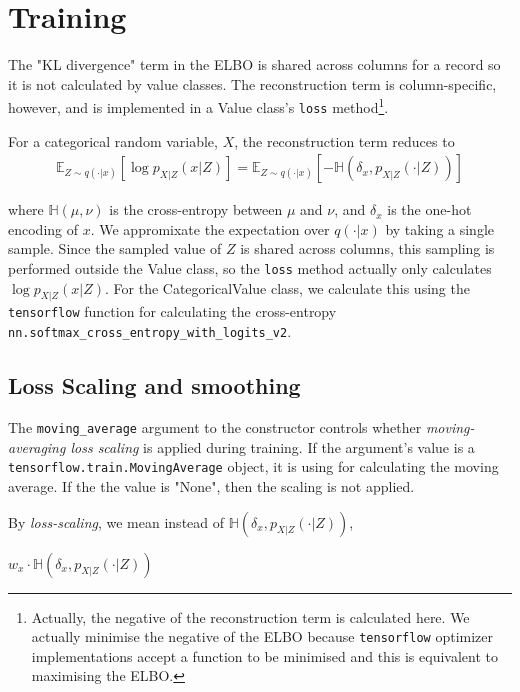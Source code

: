\documentclass[11pt]{article}
\begin{document}
\section{Training}
\label{sec:org884ffeb}
The "KL divergence" term in the ELBO is shared across columns for a record so it is not calculated by value classes. The reconstruction term is column-specific, however, and is implemented in a \textsf{Value} class's \texttt{loss} method\footnote{Actually, the negative of the reconstruction term is calculated here. We actually minimise the negative of the ELBO because \texttt{tensorflow} optimizer implementations accept a function to be minimised and this is equivalent to maximising the ELBO.}.

For a categorical random variable, \(X\), the reconstruction term reduces to 
\begin{equation}
\begin{split}
\mathbb{E}_{Z\sim q(\cdot|x)}[\log p_{X|Z}(x|Z)] = \mathbb{E}_{Z\sim q(\cdot|x)}[-\mathbb{H}(\delta_x, p_{X|Z}(\cdot|Z))]
\end{split}
\end{equation}

where \(\mathbb{H}(\mu, \nu)\) is the cross-entropy between \(\mu\) and \(\nu\), and \(\delta_x\) is the one-hot encoding of \(x\). We appromixate the expectation over \(q(\cdot|x)\) by taking a single sample. Since the sampled value of \(Z\) is shared across columns, this sampling is performed outside the \textsf{Value} class, so the \texttt{loss} method actually only calculates \(\log p_{X|Z}(x|Z)\). For the \textsf{CategoricalValue} class, we calculate this using the \texttt{tensorflow} function for calculating the cross-entropy \texttt{nn.softmax\_cross\_entropy\_with\_logits\_v2}.

\subsection{Loss Scaling and smoothing}
\label{sec:org82353df}
The \texttt{moving\_average} argument to the constructor controls whether \emph{moving-averaging loss scaling} is applied during training. If the argument's value is a \texttt{tensorflow.train.MovingAverage} object, it is using for calculating the moving average. If the the value is "None", then the scaling is not applied. 

By \emph{loss-scaling}, we mean instead of \(\mathbb{H}(\delta_x, p_{X|Z}(\cdot|Z))\), 

\(w_x\cdot\mathbb{H}(\delta_x, p_{X|Z}(\cdot|Z))\) 
\end{document}
